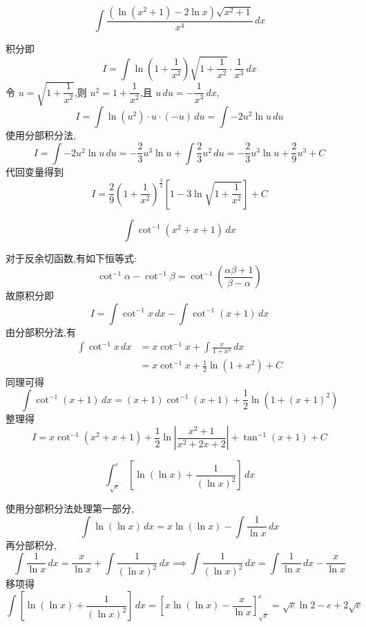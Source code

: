 \begin{questions}
    \question
    \[
    \int \frac{(\ln(x^2+1)-2\ln x)\sqrt{x^2+1}}{x^4} \, dx
    \]
    \begin{solution}
        积分即
        \[
        I = \int \ln\left(1+\frac{1}{x^2}\right) \sqrt{1+\frac{1}{x^2}} \cdot \frac{1}{x^3} \, dx
        \]
        令 $u = \sqrt{1+\dfrac{1}{x^2}}$,则 $u^2 = 1+\dfrac{1}{x^2}$,且 $u \, du = -\dfrac{1}{x^3} \, dx$,
        \[
        I = \int \ln(u^2) \cdot u \cdot (-u) \, du = \int -2 u^2 \ln u \, du
        \]
        使用分部积分法,
        \[
        I = \int -2 u^2 \ln u \, du = -\frac{2}{3} u^3 \ln u + \int \frac{2}{3} u^2 \, du = -\frac{2}{3} u^3 \ln u + \frac{2}{9} u^3 + C
        \]
        代回变量得到
        \[
        I =\frac{2}{9} \left(1+\frac{1}{x^2}\right)^{\frac{3}{2}} \left[ 1 - 3 \ln \sqrt{1+\frac{1}{x^2}} \right] + C
        \]
    \end{solution}

    \question
    \[
    \int \cot^{-1}(x^2 + x + 1) \, dx
    \]
    \begin{solution}
        对于反余切函数,有如下恒等式:
        \[
        \cot^{-1} \alpha - \cot^{-1} \beta = \cot^{-1} \left( \frac{\alpha\beta + 1}{\beta - \alpha} \right)
        \]
        故原积分即
        \[
        I = \int \cot^{-1} x \, dx - \int \cot^{-1}(x+1) \, dx
        \]
        由分部积分法,有
        \begin{align*}
        \int \cot^{-1} x \, dx &= x \cot^{-1} x + \int \frac{x}{1+x^2} \, dx \\
        &= x \cot^{-1} x + \frac{1}{2} \ln(1+x^2) + C
        \end{align*}
        同理可得
        \[
        \int \cot^{-1}(x+1) \, dx = (x+1) \cot^{-1}(x+1) + \frac{1}{2} \ln(1+(x+1)^2)
        \]
        整理得
        \[
        I = x \cot^{-1}(x^2+x+1) + \frac{1}{2} \ln\left| \frac{x^2+1}{x^2+2x+2} \right| + \tan^{-1}(x+1) + C
        \]
    \end{solution}

    \question
    \[
    \int_{\sqrt{e}}^{e} \left[ \ln(\ln x) + \frac{1}{(\ln x)^2} \right] \, dx
    \]
    \begin{solution}
        使用分部积分法处理第一部分,
        \[
        \int \ln(\ln x) \, dx = x \ln(\ln x) - \int \frac{1}{\ln x} \, dx
        \]
        再分部积分,
        \[
        \int \frac{1}{\ln x} \, dx = \frac{x}{\ln x} + \int \frac{1}{(\ln x)^2} \, dx \implies \int \frac{1}{(\ln x)^2} \, dx = \int \frac{1}{\ln x} \, dx - \frac{x}{\ln x}
        \]
        移项得
        \[
        \int \left[ \ln(\ln x) + \frac{1}{(\ln x)^2} \right] \, dx = \left[ x \ln(\ln x) - \frac{x}{\ln x} \right]_{\sqrt{e}}^{e} = \sqrt{e} \ln 2 - e + 2\sqrt{e}
        \]
    \end{solution}


\end{questions}
